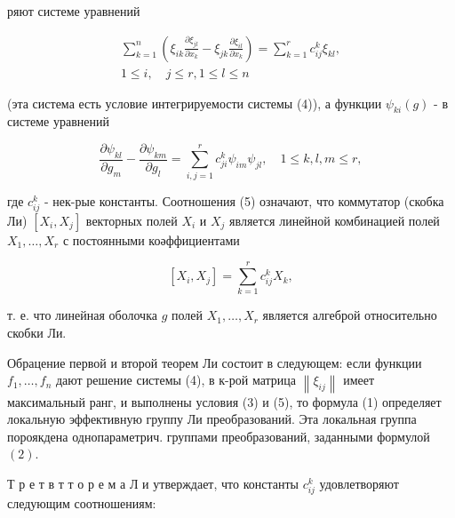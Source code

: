 \documentclass[10pt]{article}
\begin{document}
ряют системе уравнений



\[

\begin{gathered}

\sum_{k=1}^{n}\left(\xi_{i k} \frac{\partial \xi_{j l}}{\partial x_{k}}-\xi_{j k} \frac{\partial \xi_{i l}}{\partial x_{k}}\right)=\sum_{k=1}^{r} c_{i j}^{k} \xi_{k l}, \\

1 \leqslant i, \quad j \leqslant r, 1 \leqslant l \leqslant n

\end{gathered}

\]



(эта система есть условие интегрируемости системы (4)), а функции $\psi_{k i}(g)$ - в системе уравнений



\[

\frac{\partial \psi_{k l}}{\partial g_{m}}-\frac{\partial \psi_{k m}}{\partial g_{l}}=\sum_{i, j=1}^{r} c_{j i}^{k} \psi_{i m} \psi_{j l}, \quad 1 \leqslant k, l, m \leqslant r,

\]



где $c_{i j}^{k}$ - нек-рые константы. Соотношения (5) означают, что коммутатор (скобка Ли) $\left[X_{i}, X_{j}\right]$ векторных полей $X_{i}$ и $X_{j}$ является линейной комбинацией полей $X_{1}, \ldots, X_{r}$ с постоянными коәффициентами



\[

\left[X_{i}, X_{j}\right]=\sum_{k=1}^{r} c_{i j}^{k} X_{k},

\]



т. е. что линейная оболочка $g$ полей $X_{1}, \ldots, X_{r}$ является алгеброй относительно скобки Ли.



Обрацение первой и второй теорем Ли состоит в следующем: если функции $f_{1}, \ldots, f_{n}$ дают решение системы (4), в к-рой матрица $\left\|\xi_{i j}\right\|$ имеет максимальный ранг, и выполнены условия (3) и (5), то формула (1) определяет локальную эффективную группу Ли преобразований. Эта локальная группа пороякдена однопараметрич. группами преобразований, заданными формулой $(2)$.



Т р е т в т т о р е м а Л и утверждает, что константы $c_{i j}^{k}$ удовлетворяют следующим соотношениям:
\end{document}
